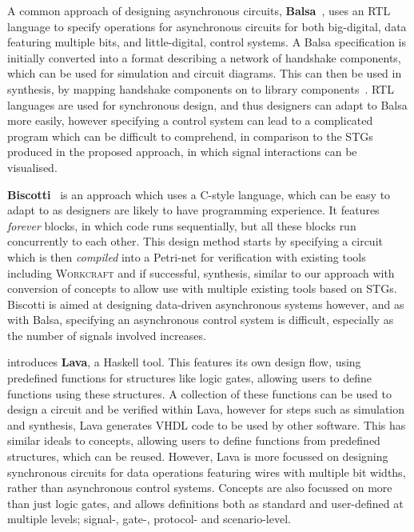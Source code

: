 \documentclass[british, journal]{IEEEtran}
\newcommand{\noun}[1]{\textsc{#1}}
\begin{document}
A common approach of designing asynchronous circuits,
\textbf{Balsa}~\cite{edwards2002balsa}, uses an RTL language to specify
operations for asynchronous circuits for both big-digital, data featuring
multiple bits, and little-digital, control systems. A Balsa specification is
initially converted into a format describing a network of handshake components,
which can be used for simulation and circuit diagrams. This can then be used in
synthesis, by mapping handshake components on to library
components~\cite{van1993handshake}. RTL languages
are used for synchronous design, and thus designers can adapt to Balsa
more easily, however specifying a control system can lead to a complicated
program which can be difficult to
comprehend, in comparison to the STGs produced in the proposed approach,
in which signal interactions can be visualised.

\textbf{Biscotti}~\cite{5232351} is an approach which uses a C-style language,
which can be easy to adapt to as designers are likely to have programming
experience. It features
\emph{forever} blocks, in which code runs sequentially, but all these
blocks run concurrently to each other. This design method starts by
specifying a circuit which is then
\emph{compiled} into a Petri-net for verification with existing tools
including \noun{Workcraft} and if successful, synthesis, similar to our
approach with conversion of concepts to allow
use with multiple existing tools based on STGs. Biscotti is aimed at
designing data-driven asynchronous systems however, and as with Balsa,
specifying an asynchronous control system is
difficult, especially as the number of signals involved increases.

\cite{bjesse1998lava} introduces \textbf{Lava}, a Haskell tool. This features its own design flow, using predefined functions for structures like logic gates, allowing users to define
functions using these structures. A collection of these functions can be used to design a circuit and be verified within Lava, however for steps such as simulation and synthesis, Lava
generates VHDL code to be used by other software. This has similar ideals to concepts, allowing users to define functions from predefined structures, which can be reused. However,
Lava is more focussed on designing synchronous circuits for data operations featuring wires with multiple bit widths, rather than asynchronous control systems. Concepts are also
focussed on more than just logic gates, and allows definitions both as standard and user-defined at multiple levels; signal-, gate-, protocol- and scenario-level.
\end{document}
